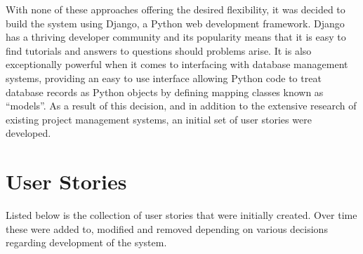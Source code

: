 \documentclass[a4paper]{l3proj}
\begin{document}
With none of these approaches offering the desired flexibility, it was decided to build the system using Django, a Python web development framework. Django has a thriving developer community and its popularity means that it is easy to find tutorials and answers to questions should problems arise. It is also exceptionally powerful when it comes to interfacing with database management systems, providing an easy to use interface allowing Python code to treat database records as Python objects by defining mapping classes known as “models”. As a result of this decision, and in addition to the extensive research of existing project management systems, an initial set of user stories were developed.

\section{User Stories}
\label{userStories}

Listed below is the collection of user stories that were initially created.  Over time these were added to, modified and removed depending on various decisions regarding development of the system.
\end{document}
